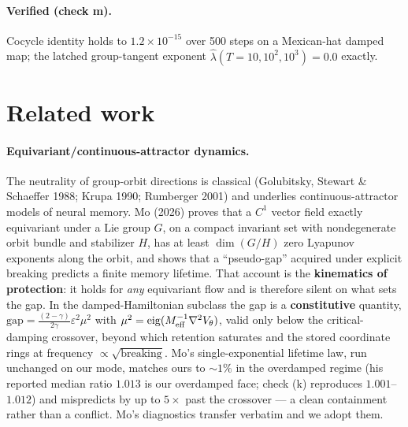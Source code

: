 \documentclass[11pt]{article}
\theoremstyle{plain}
\theoremstyle{definition}
\begin{document}
\paragraph{Verified (check m).} Cocycle identity holds to $1.2\times10^{-15}$ over 500 steps on a Mexican-hat damped map; the latched group-tangent exponent $\widehat\lambda(T=10,10^2,10^3)=0.0$ exactly.

\section{Related work}
\paragraph{Equivariant/continuous-attractor dynamics.} The neutrality of group-orbit directions is classical (Golubitsky, Stewart \& Schaeffer 1988; Krupa 1990; Rumberger 2001) and underlies continuous-attractor models of neural memory. Mo (2026) proves that a $C^1$ vector field exactly equivariant under a Lie group $G$, on a compact invariant set with nondegenerate orbit bundle and stabilizer $H$, has at least $\dim(G/H)$ zero Lyapunov exponents along the orbit, and shows that a ``pseudo-gap'' acquired under explicit breaking predicts a finite memory lifetime. That account is the \textbf{kinematics of protection}: it holds for \emph{any} equivariant flow and is therefore silent on what sets the gap. In the damped-Hamiltonian subclass the gap is a \textbf{constitutive} quantity, $\mathrm{gap}=\tfrac{(2-\gamma)}{2\gamma}\varepsilon^2\mu^2$ with $\mu^2=\mathrm{eig}(M_{\rm eff}^{-1}\nabla^2V_\theta)$, valid only below the critical-damping crossover, beyond which retention saturates and the stored coordinate rings at frequency $\propto\sqrt{\text{breaking}}$. Mo's single-exponential lifetime law, run unchanged on our mode, matches ours to $\sim1\%$ in the overdamped regime (his reported median ratio $1.013$ is our overdamped face; check (k) reproduces $1.001$--$1.012$) and mispredicts by up to $5\times$ past the crossover --- a clean containment rather than a conflict. Mo's diagnostics transfer verbatim and we adopt them.
\end{document}
